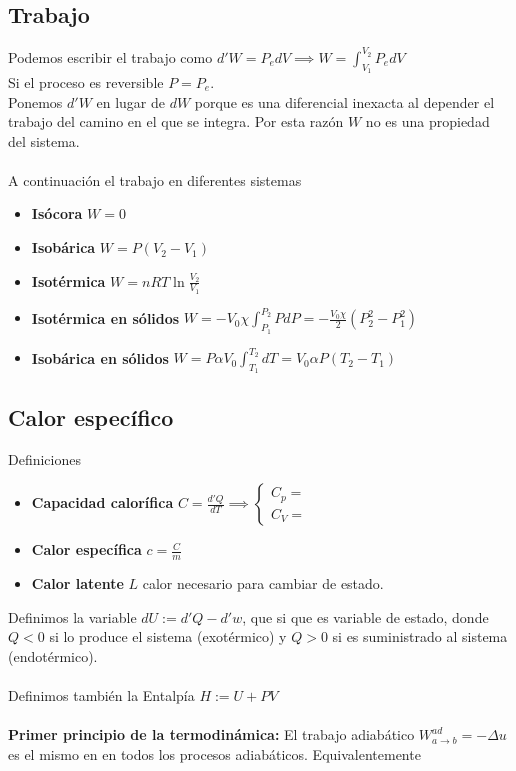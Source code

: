 \documentclass{myclass}
\begin{document}
\subsection{Trabajo}
Podemos escribir el trabajo como $\boxed{d'W = P_edV} \implies W = \int_{V_1}^{V_2}P_edV$ \\
Si el proceso es reversible $P = P_e$. \\
Ponemos $d'W$ en lugar de $dW$ porque es una diferencial inexacta al depender el trabajo del camino en el que se integra. Por esta razón $W$ no es una propiedad del sistema. \\
\\
A continuación el trabajo en diferentes sistemas
\begin{itemize}
    \item \textbf{Isócora} $W = 0$
    \item \textbf{Isobárica} $W = P(V_2-V_1)$
    \item \textbf{Isotérmica} $W = nRT\ln{\frac{V_2}{V_1}}$
    \item \textbf{Isotérmica en sólidos} $W = -V_0\chi\int_{P_1}^{P_2}PdP = -\frac{V_0\chi}{2}(P_2^2-P_1^2)$
    \item \textbf{Isobárica en sólidos} $W = P\alpha V_0\int_{T_1}^{T_2}dT = V_0\alpha P (T_2-T_1)$
\end{itemize}
\subsection{Calor específico}
Definiciones
\begin{itemize}
    \item \textbf{Capacidad calorífica} $C=\frac{d'Q}{dT} \implies \begin{cases}
    C_p= \\
    C_V=
    \end{cases}$
    \item \textbf{Calor específica} $c=\frac{C}{m}$
    \item \textbf{Calor latente} $L$ calor necesario para cambiar de estado.
\end{itemize}

Definimos la variable $\boxed{dU := d'Q - d'w}$, que si que es variable de estado, donde $Q<0$ si lo produce el sistema (exotérmico) y $Q>0$ si es suministrado al sistema (endotérmico). \\
\\
Definimos también la Entalpía $\boxed{H:=U+PV}$ \\
\\
\textbf{Primer principio de la termodinámica:} El trabajo adiabático $\boxed{W^{ad}_{a\to b} = -\Delta u}$ es el mismo en en todos los procesos adiabáticos.
Equivalentemente 
\end{document}

